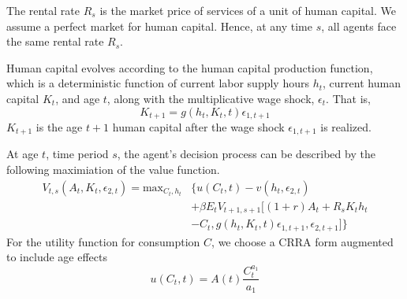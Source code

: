 \documentclass[\econtexRoot/ImaiKeane]{subfiles}
\begin{document}
The rental rate $R_s$ is the market price of services of a unit of human capital. We assume a perfect market for human capital. Hence, at any time $s$, all agents face the same rental rate $R_s$. \par
Human capital evolves according to the human capital production function, which is a deterministic function of current labor supply hours $h_t$, current human capital $K_t$, and age $t$, along with the multiplicative wage shock, $\epsilon_t$. That is,
\begin{equation} \tag{4}
  \label{eq:HCevolution}
  K_{t+1} = g(h_t, K_t, t) \epsilon_{1,t+1}
\end{equation}
$K_{t+1}$ is the age $t+1$ human capital after the wage shock $\epsilon_{1,t+1}$ is realized. \par
At age $t$, time period $s$, the agent's decision process can be described by the following maximiation of the value function.
\begin{equation} \tag{5}
  \begin{split}
      V_{t,s}(A_t,K_t,\epsilon_{2,t})=\text{max}_{C_t,h_t} & \{u(C_t,t)-v(h_t, \epsilon_{2,t}) \\ & + \beta E_t V_{t+1,s+1}[(1+r)A_t + R_s K_t h_t \\ & -C_t, g(h_t,K_t,t)\epsilon_{1,t+1}, \epsilon_{2,t+1}]\}
  \end{split}
\end{equation}
    For the utility function for consumption $C$, we choose a CRRA form augmented to include age effects
    \begin{equation*}
      u(C_t,t)=A(t)\dfrac{C_t^{a_1}}{a_1}
    \end{equation*}
\end{document}
